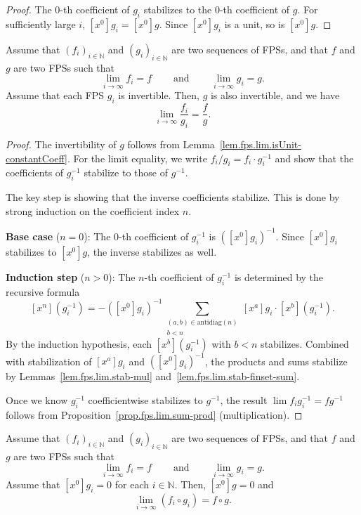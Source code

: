 \begin{proof}
\leanok
The $0$-th coefficient of $g_i$ stabilizes to the $0$-th coefficient of $g$.
For sufficiently large $i$, $[x^0]g_i = [x^0]g$. Since $[x^0]g_i$ is a unit,
so is $[x^0]g$.
\end{proof}

\begin{proposition}
\label{prop.fps.lim.sum-quot}
\leantarget
\leanok
Assume that $\left(  f_{i}\right)  _{i\in
\mathbb{N}}$ and $\left(  g_{i}\right)  _{i\in\mathbb{N}}$ are two sequences
of FPSs, and that $f$ and $g$ are two FPSs such that%
\[
\lim\limits_{i\rightarrow\infty}f_{i}=f\ \ \ \ \ \ \ \ \ \ \text{and}%
\ \ \ \ \ \ \ \ \ \ \lim\limits_{i\rightarrow\infty}g_{i}=g.
\]
Assume that each FPS $g_{i}$ is invertible. Then, $g$ is also invertible, and
we have%
\[
\lim\limits_{i\rightarrow\infty}\dfrac{f_{i}}{g_{i}}=\dfrac{f}{g}.
\]
\end{proposition}

\begin{proof}
\leanok
The invertibility of $g$ follows from Lemma~\ref{lem.fps.lim.isUnit-constantCoeff}.
For the limit equality, we write $f_i / g_i = f_i \cdot g_i^{-1}$ and show
that the coefficients of $g_i^{-1}$ stabilize to those of $g^{-1}$.

The key step is showing that the inverse coefficients stabilize. This is done
by strong induction on the coefficient index $n$.

\textbf{Base case} ($n = 0$): The $0$-th coefficient of $g_i^{-1}$ is
$([x^0]g_i)^{-1}$. Since $[x^0]g_i$ stabilizes to $[x^0]g$, the inverse
stabilizes as well.

\textbf{Induction step} ($n > 0$): The $n$-th coefficient of $g_i^{-1}$
is determined by the recursive formula
\[
[x^n](g_i^{-1}) = -([x^0]g_i)^{-1} \sum_{\substack{(a,b) \in \mathrm{antidiag}(n) \\ b < n}}
[x^a]g_i \cdot [x^b](g_i^{-1}).
\]
By the induction hypothesis, each $[x^b](g_i^{-1})$ with $b < n$ stabilizes.
Combined with stabilization of $[x^a]g_i$ and $([x^0]g_i)^{-1}$, the
products and sums stabilize by Lemmas~\ref{lem.fps.lim.stab-mul}
and~\ref{lem.fps.lim.stab-finset-sum}.

Once we know $g_i^{-1}$ coefficientwise stabilizes to $g^{-1}$, the result
$\lim f_i g_i^{-1} = f g^{-1}$ follows from
Proposition~\ref{prop.fps.lim.sum-prod} (multiplication).
\end{proof}

\begin{proposition}
\label{prop.fps.lim.comp}
\leantarget
\leanok
Assume that $\left(  f_{i}\right)  _{i\in\mathbb{N}}$
and $\left(  g_{i}\right)  _{i\in\mathbb{N}}$ are two sequences of FPSs, and
that $f$ and $g$ are two FPSs such that%
\[
\lim\limits_{i\rightarrow\infty}f_{i}=f\ \ \ \ \ \ \ \ \ \ \text{and}%
\ \ \ \ \ \ \ \ \ \ \lim\limits_{i\rightarrow\infty}g_{i}=g.
\]
Assume that $\left[  x^{0}\right]  g_{i}=0$ for each $i\in\mathbb{N}$. Then,
$\left[  x^{0}\right]  g=0$ and%
\[
\lim\limits_{i\rightarrow\infty}\left(  f_{i}\circ g_{i}\right)  =f\circ g.
\]
\end{proposition}

